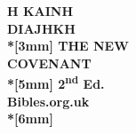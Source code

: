 \documentclass{book}
\begin{document}
\begin{center}
\vspace*{30mm}
\bfseries
\textgreek{H KAINH}\\
\textgreek{DIAJHKH}\\*[3mm]
THE NEW\\
COVENANT\\*[5mm]
\small
2\textsuperscript{nd} Ed.\\
\vfill
Bibles.org.uk\\*[6mm]
\null
\end{center}
\end{document}
